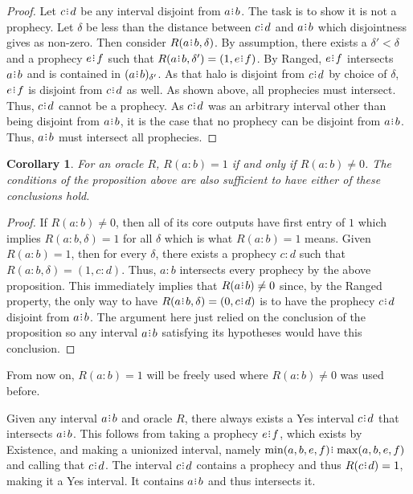\documentclass[12pt]{article}
\newtheorem{corollary}{Corollary}[section]
\begin{document}
\begin{proof}
     Let $c\rint d$ be any interval disjoint from $a\rint b$. The task is to show it is not a prophecy. Let $\delta$ be less than the distance between $c \rint d$ and $a \rint b$ which disjointness gives as non-zero. Then consider $R(a \rint b, \delta)$. By assumption, there exists a $\delta' < \delta$ and a prophecy $e \rint f$ such that $R(a \rint b, \delta') = (1, e \rint f)$. By Ranged, $e \rint f$ intersects $a \rint b$ and is contained in $\halo[\delta']{a \rint b}$. As that halo is disjoint from $c \rint d$ by choice of $\delta$, $e \rint f$ is disjoint from $c\rint d$ as well. As shown above, all prophecies must intersect. Thus, $c\rint d$ cannot be a prophecy. As $c\rint d$ was an arbitrary interval other than being disjoint from $a\rint b$, it is the case that no prophecy can be disjoint from $a\rint b$. Thus, $a\rint b$ must intersect all prophecies.
\end{proof}

\begin{corollary}
    For an oracle $R$, $R(a:b) = 1$ if and only if $R(a:b) \neq 0$. The conditions of the proposition above are also sufficient to have either of these conclusions hold. 
\end{corollary}

\begin{proof}
    If $R(a:b) \neq 0$, then all of its core outputs have first entry of $1$ which implies $R(a:b, \delta)=1$ for all $\delta$ which is what $R(a:b) = 1$ means. Given $R(a:b)= 1$, then for every $\delta$, there exists a prophecy $c:d$ such that $R(a:b, \delta) = (1, c:d)$. Thus, $a:b$ intersects every prophecy by the above proposition. This immediately implies that $R(a\rint b) \neq 0$ since, by the Ranged property, the only way to have $R(a\rint b, \delta) = (0, c\rint d)$ is to have the prophecy $c\rint d$ disjoint from $a\rint b$. The argument here just relied on the conclusion of the proposition so any interval $a \rint b$ satisfying its hypotheses would have this conclusion. 
\end{proof}

From now on, $R(a:b)=1$ will be freely used where $R(a:b) \neq 0$ was used before. 


Given any interval $a\rint b$ and oracle $R$, there always exists a Yes interval $c\rint d$ that intersects $a\rint b$. This follows from taking a prophecy $e\rint f$, which exists by Existence, and making a unionized interval, namely $\min(a,b,e,f)\rint \max(a,b,e,f)$ and calling that $c\rint d$. The interval $c\rint d$ contains a prophecy and thus $R(c\rint d) = 1$, making it a Yes interval. It contains $a\rint b$ and thus intersects it. 
\end{document}

